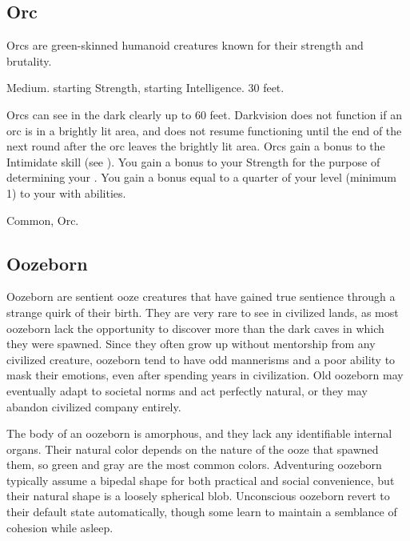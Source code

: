    \subsection{Orc}
        Orcs are green-skinned humanoid creatures known for their strength and brutality.

         Medium.
          starting Strength,  starting Intelligence.
         30 feet.
        \begin{itemize}
             Orcs can see in the dark clearly up to 60 feet.
                Darkvision does not function if an orc is in a brightly lit area, and does not resume functioning until the end of the next round after the orc leaves the brightly lit area.
             Orcs gain a  bonus to the Intimidate skill (see ).
             You gain a  bonus to your Strength for the purpose of determining your .
             You gain a bonus equal to a quarter of your level (minimum 1) to your  with  abilities.
        \end{itemize}
         Common, Orc.

    \subsection{Oozeborn}
        Oozeborn are sentient ooze creatures that have gained true sentience through a strange quirk of their birth.
        They are very rare to see in civilized lands, as most oozeborn lack the opportunity to discover more than the dark caves in which they were spawned.
        Since they often grow up without mentorship from any civilized creature, oozeborn tend to have odd mannerisms and a poor ability to mask their emotions, even after spending years in civilization.
        Old oozeborn may eventually adapt to societal norms and act perfectly natural, or they may abandon civilized company entirely.

        The body of an oozeborn is amorphous, and they lack any identifiable internal organs.
        Their natural color depends on the nature of the ooze that spawned them, so green and gray are the most common colors.
        Adventuring oozeborn typically assume a bipedal shape for both practical and social convenience, but their natural shape is a loosely spherical blob.
        Unconscious oozeborn revert to their default state automatically, though some learn to maintain a semblance of cohesion while asleep.


